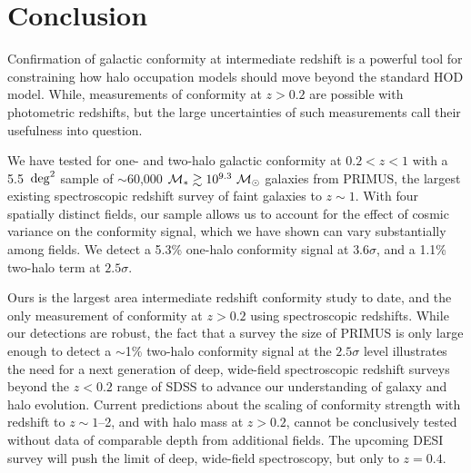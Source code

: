 
\section{Conclusion}\label{sec:conclusion}

Confirmation of galactic conformity at intermediate redshift is a powerful tool for constraining how halo occupation models should move beyond the standard HOD model.
While, measurements of conformity at $z>0.2$ are possible with photometric redshifts, but the large uncertainties of such measurements call their usefulness into question.

We have tested for one- and two-halo galactic conformity at ${0.2<z<1}$ with a 5.5~$\degsq$ sample of $\sim$60,000 ${\mstar\gtrsim10^{9.3}~\msun}$ galaxies from PRIMUS, the largest existing spectroscopic redshift survey of faint galaxies to ${z\sim1}$.
With four spatially distinct fields, our sample allows us to account for the effect of cosmic variance on the conformity signal, which we have shown can vary substantially among fields.
We detect a 5.3\% one-halo conformity signal at $3.6\sigma$, and a 1.1\% two-halo term at $2.5\sigma$.

Ours is the largest area intermediate redshift conformity study to date, and the only measurement of conformity at $z>0.2$ using spectroscopic redshifts.
While our detections are robust, the fact that a survey the size of PRIMUS is only large enough to detect a $\sim$1\% two-halo conformity signal at the $2.5\sigma$ level illustrates the need for a next generation of deep, wide-field spectroscopic redshift surveys beyond the ${z<0.2}$ range of SDSS to advance our understanding of galaxy and halo evolution.
Current predictions about the scaling of conformity strength with redshift to $z\sim1$--2, and with halo mass at ${z>0.2}$, cannot be conclusively tested without data of comparable depth from additional fields.
The upcoming DESI survey will push the limit of deep, wide-field spectroscopy, but only to ${z=0.4}$.
